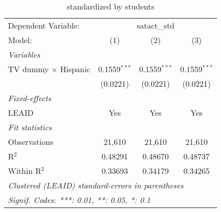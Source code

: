 \begin{table}[htbp]
\centering
\caption{ standardized by students}
\begin{tabular}{lccc}
\tabularnewline\midrule\midrule
Dependent Variable:&\multicolumn{3}{c}{satact\_std}\\
Model:&(1) & (2) & (3)\\
\midrule \emph{Variables}&   &   &  \\
TV dummy $\times$ Hispanic & 0.1559$^{***}$ & 0.1559$^{***}$ & 0.1559$^{***}$\\
  &(0.0221) & (0.0221) & (0.0221)\\
\midrule \emph{Fixed-effects}&   &   &  \\
LEAID & Yes & Yes & Yes\\
\midrule \emph{Fit statistics}&  & & \\
Observations & 21,610&21,610&21,610\\
R$^2$ & 0.48291&0.48670&0.48737\\
Within R$^2$ & 0.33693&0.34179&0.34265\\
\midrule\midrule\multicolumn{4}{l}{\emph{Clustered (LEAID) standard-errors in parentheses}}\\
\multicolumn{4}{l}{\emph{Signif. Codes: ***: 0.01, **: 0.05, *: 0.1}}\\
\end{tabular}
\end{table}


